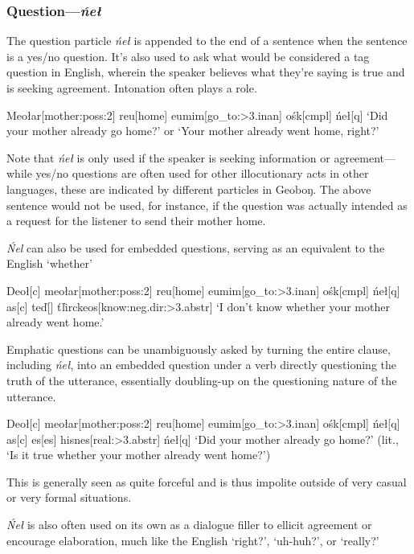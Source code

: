\documentclass[a4paper,11pt,oneside,openany]{memoir}
\newcommand{\vt}{ť}
\newcommand{\vd}{ď}
\newcommand{\vl}{ľ}
\newcommand{\engma}{ŋ}
\begin{document}
\subsubsection{Question---\textit{\'ne\l}}

The question particle \textit{\'ne\l} is appended to the end of a sentence when the sentence is a yes/no question. It's also used to ask what would be considered a tag question in English, wherein the speaker believes what they're saying is true and is seeking agreement. Intonation often plays a role.

\ex
\begingl
Meo\l ar[mother:{\sc poss:2}]
reu[home]
eumim[go\_to:{\sc >3.inan}]
o\'sk[\sc cmpl]
\'ne\l[\sc q]
\glft `Did your mother already go home?' or `Your mother already went home, right?'
\endgl 
\xe

Note that \textit{\'ne\l} is only used if the speaker is seeking information or agreement---while yes/no questions are often used for other illocutionary acts in other languages, these are indicated by different particles in Geobo{\engma}. The above sentence would not be used, for instance, if the question was actually intended as a request for the listener to send their mother home.

\textit{\'Nel} can also be used for embedded questions, serving as an equivalent to the English `whether'

\ex
\begingl
Deo\l[\sc c]
meo\l ar[mother:{\sc poss:2}]
reu[home]
eumim[go\_to:{\sc >3.inan}]
o\'sk[\sc cmpl]
\'ne\l[\sc q]
\nogloss{,}
as[\sc c]
te\vd[]
\vt\vl irckeos[know:{\sc neg.dir:>3.abstr}]
\glft `I don't know whether your mother already went home.'
\endgl
\xe

Emphatic questions can be unambiguously asked by turning the entire clause, including \textit{\'ne\l}, into an embedded question under a verb directly questioning the truth of the utterance, essentially doubling-up on the questioning nature of the utterance.

\ex
\begingl
Deo\l[\sc c]
meo\l ar[mother:{\sc poss:2}]
reu[home]
eumim[go\_to:{\sc >3.inan}]
o\'sk[\sc cmpl]
\'ne\l[\sc q]
\nogloss{,}
as[\sc c]
es[\sc es]
hisnes[real:{\sc >3.abstr}]
\'ne\l[\sc q]
\glft `Did your mother already go home?' (lit., `Is it true whether your mother already went home?')
\endgl 
\xe

This is generally seen as quite forceful and is thus impolite outside of very casual or very formal situations.

\textit{\'Ne\l} is also often used on its own as a dialogue filler to ellicit agreement or encourage elaboration, much like the English `right?', `uh-huh?', or `really?'
\end{document}
